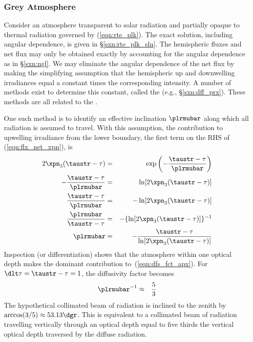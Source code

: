 \documentclass[12pt]{article}
\begin{document}
\subsubsection[Grey Atmosphere]{Grey Atmosphere}\label{sxn:gry}
Consider an atmosphere transparent to solar radiation and partially
opaque to thermal radiation governed by (\ref{eqn:rte_plk}).
The exact solution, including angular dependence, is given in
\S\ref{sxn:rte_plk_sln}.
The hemispheric fluxes and net flux may only be obtained exactly by
accounting for the angular dependence as in \S\ref{sxn:ngl}.
We may eliminate the angular dependence of the net flux by making the
simplifying assumption that the hemispheric up and downwelling
irradiances equal a constant times the corresponding intensity. 
A number of methods exist to determine this constant, called the 
 (e.g., \S\ref{sxn:dff_prx}).
These methods are all related to the .

One such method \cite[][p.~232]{Sal96} is to identify an effective
inclination $\plrmubar$ along which all radiation is assumed to
travel.
With this assumption, the contribution to upwelling irradiance from
the lower boundary, the first term on the RHS of (\ref{eqn:flx_net_xpn}), is
\begin{eqnarray}
2 \xpn_{3}(\taustr - \tau) & = & 
\exp \left( -\frac{\taustr - \tau}{\plrmubar} \right) \nonumber \\
-\frac{\taustr - \tau}{\plrmubar} & = & \ln [ 2 \xpn_{3}(\taustr - \tau) ] \nonumber \\
\frac{\taustr - \tau}{\plrmubar} & = & -\ln [ 2 \xpn_{3}(\taustr - \tau) ] \nonumber \\
\frac{\plrmubar}{\taustr - \tau} & = & -\{ \ln [ 2 \xpn_{3}(\taustr - \tau) ] \}^{-1} \nonumber \\
\plrmubar & = & - \frac{\taustr - \tau}{ \ln [ 2 \xpn_{3}(\taustr - \tau) ] }
\label{eqn:dfs_fct_apx}
\end{eqnarray}
Inspection (or differentiation) shows that the atmosphere within one
optical depth makes the dominant contribution to~(\ref{eqn:dfs_fct_apx}).
For $\dlt\tau = \taustr - \tau = 1$, the diffusivity factor becomes
\begin{eqnarray}
  \plrmubar^{-1} & \approx & \frac{5}{3}
\label{eqn:plr_mu_bar_dfn}
\end{eqnarray}
The hypothetical collimated beam of radiation is inclined to the zenith
by $\arccos(3/5) \approx 53.13\dgr$.
This is equivalent to a collimated beam of radiation travelling
vertically through an optical depth equal to five thirds the vertical
optical depth traversed by the diffuse radiation. 
\end{document}
